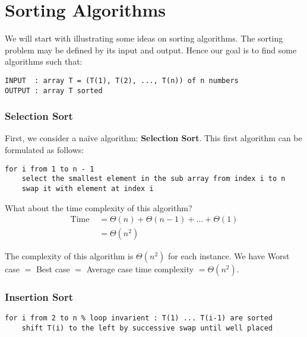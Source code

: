 
\part{Sorting Algorithms}

We will start with illustrating some ideas on sorting algorithms. The sorting problem may be defined by its input and output. Hence our goal is to find some algorithms such that: 


\begin{lstlisting}[label={list:c1:inout},caption=Inputs and outputs of sorting algorithms]
INPUT  : array T = (T(1), T(2), ..., T(n)) of n numbers
OUTPUT : array T sorted
\end{lstlisting}


\section{Selection Sort}

First, we consider a naïve algorithm: \textbf{Selection Sort}. This first algorithm can be formulated as follows:

\begin{lstlisting}[label={list:c1:selection},caption=Pseudo-code of the selection sort algorithm]
for i from 1 to n - 1
    select the smallest element in the sub array from index i to n
    swap it with element at index i
\end{lstlisting}


What about the time complexity of this algorithm?
\begin{align*}
\text{Time } &= \Theta(n) + \Theta(n-1) + \ldots + \Theta(1) \\
& = \Theta(n^2)
\end{align*}

\begin{remark}
The complexity of this algorithm is $\Theta(n^2)$ for each instance. We have Worst case $=$ Best case $=$ Average case time complexity $= \Theta(n^2)$.
\end{remark}

\section{Insertion Sort}

\begin{lstlisting}[label={list:c1:insertion},caption=Pseudo-code of the insertion sort algorithm]
for i from 2 to n % loop invarient : T(1) ... T(i-1) are sorted
    shift T(i) to the left by successive swap until well placed
\end{lstlisting}

